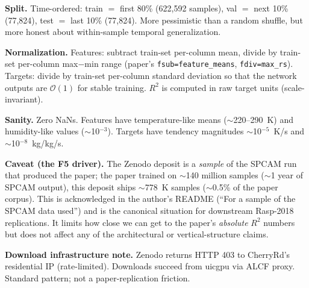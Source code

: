 \documentclass[11pt]{article}
\begin{document}
\textbf{Split.} Time-ordered: train $=$ first 80\% (622{,}592 samples),
val $=$ next 10\% (77{,}824), test $=$ last 10\% (77{,}824). More
pessimistic than a random shuffle, but more honest about within-sample
temporal generalization.

\textbf{Normalization.} Features: subtract train-set per-column mean,
divide by train-set per-column max$-$min range (paper's \texttt{fsub=feature\_means},
\texttt{fdiv=max\_rs}). Targets: divide by train-set per-column standard
deviation so that the network outputs are $\mathcal{O}(1)$ for stable
training. $R^2$ is computed in raw target units (scale-invariant).

\textbf{Sanity.} Zero NaNs. Features have temperature-like means
($\sim$220--290~K) and humidity-like values ($\sim$10$^{-3}$). Targets have
tendency magnitudes $\sim$10$^{-5}$~K/s and $\sim$10$^{-8}$~kg/kg/s.

\textbf{Caveat (the F5 driver).} The Zenodo deposit is a \emph{sample} of
the SPCAM run that produced the paper; the paper trained on $\sim$140
million samples ($\sim$1 year of SPCAM output), this deposit ships
$\sim$778~K samples ($\sim$0.5\% of the paper corpus). This is acknowledged
in the author's README (``For a sample of the SPCAM data used'') and is the
canonical situation for downstream Rasp-2018 replications. It limits how
close we can get to the paper's \emph{absolute} $R^2$ numbers but does not
affect any of the architectural or vertical-structure claims.

\textbf{Download infrastructure note.} Zenodo returns HTTP 403 to
CherryRd's residential IP (rate-limited). Downloads succeed from uicgpu via
ALCF proxy. Standard pattern; not a paper-replication friction.
\end{document}
